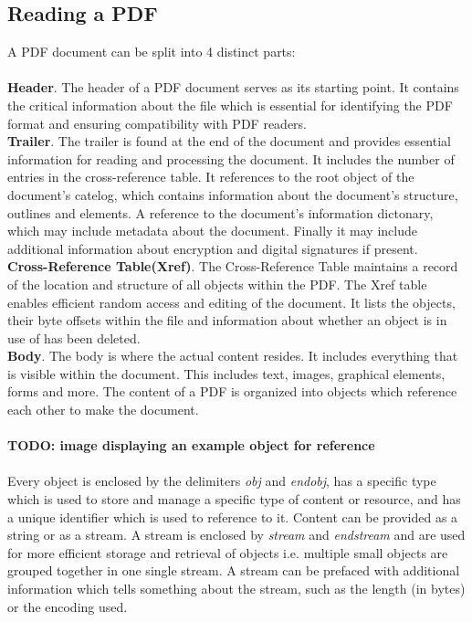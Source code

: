 \subsection{Reading a PDF}
A PDF document can be split into 4 distinct parts: 
\\\\
\textbf{Header}. The header of a PDF document serves as its starting point. It contains the critical information about the file which is essential for identifying the PDF format and ensuring compatibility with PDF readers. \\
\textbf{Trailer}. The trailer is found at the end of the document and provides essential information for reading and processing the document. It includes the number of entries in the cross-reference table. It references to the root object of the document's catelog, which contains information about the document's structure, outlines and elements. A reference to the document's information dictonary, which may include metadata about the document. Finally it may include additional information about encryption and digital signatures if present. \\
\textbf{Cross-Reference Table(Xref)}. The Cross-Reference Table maintains a record of the location and structure of all objects within the PDF. The Xref table enables efficient random access and editing of the document. It lists the objects, their byte offsets within the file and information about whether an object is in use of has been deleted. \\
\textbf{Body}. The body is where the actual content resides. It includes everything that is visible within the document. This includes text, images, graphical elements, forms and more. The content of a PDF is organized into objects which reference each other to make the document. 
\\\\
\textbf{TODO: image displaying an example object for reference}
\\\\
Every object is enclosed by the delimiters \textit{obj} and \textit{endobj}, has a specific type which is used to store and manage a specific type of content or resource, and has a unique identifier which is used to reference to it. Content can be provided as a string or as a stream. A stream is enclosed by \textit{stream} and \textit{endstream} and are used for more efficient storage and retrieval of objects i.e. multiple small objects are grouped together in one single stream. A stream can be prefaced with additional information which tells something about the stream, such as the length (in bytes) or the encoding used.
